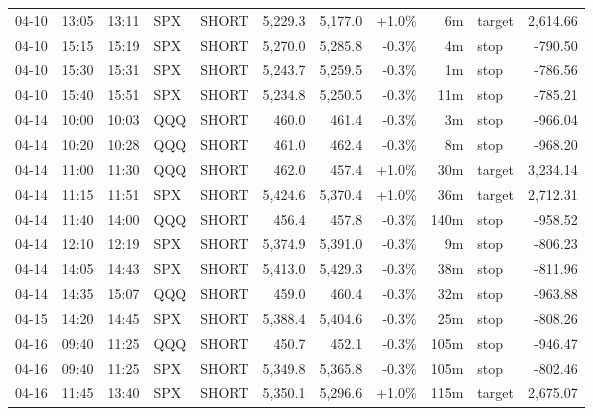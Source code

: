\documentclass[11pt,a4paper,twoside]{article}
\begin{document}
\begin{center}
\begin{longtable}{>{\color{txtmain}}l l l l l r r r r >{\color{txtmain}}l r}
04-10 & 13:05 & 13:11 & SPX & SHORT & 5,229.3 & 5,177.0 & \textcolor{wingreen}{+1.0\%} & 6m & target & \textcolor{wingreen}{2,614.66} \\
04-10 & 15:15 & 15:19 & SPX & SHORT & 5,270.0 & 5,285.8 & \textcolor{lossred}{-0.3\%} & 4m & stop & \textcolor{lossred}{-790.50} \\
04-10 & 15:30 & 15:31 & SPX & SHORT & 5,243.7 & 5,259.5 & \textcolor{lossred}{-0.3\%} & 1m & stop & \textcolor{lossred}{-786.56} \\
04-10 & 15:40 & 15:51 & SPX & SHORT & 5,234.8 & 5,250.5 & \textcolor{lossred}{-0.3\%} & 11m & stop & \textcolor{lossred}{-785.21} \\
04-14 & 10:00 & 10:03 & QQQ & SHORT & 460.0 & 461.4 & \textcolor{lossred}{-0.3\%} & 3m & stop & \textcolor{lossred}{-966.04} \\
04-14 & 10:20 & 10:28 & QQQ & SHORT & 461.0 & 462.4 & \textcolor{lossred}{-0.3\%} & 8m & stop & \textcolor{lossred}{-968.20} \\
04-14 & 11:00 & 11:30 & QQQ & SHORT & 462.0 & 457.4 & \textcolor{wingreen}{+1.0\%} & 30m & target & \textcolor{wingreen}{3,234.14} \\
04-14 & 11:15 & 11:51 & SPX & SHORT & 5,424.6 & 5,370.4 & \textcolor{wingreen}{+1.0\%} & 36m & target & \textcolor{wingreen}{2,712.31} \\
04-14 & 11:40 & 14:00 & QQQ & SHORT & 456.4 & 457.8 & \textcolor{lossred}{-0.3\%} & 140m & stop & \textcolor{lossred}{-958.52} \\
04-14 & 12:10 & 12:19 & SPX & SHORT & 5,374.9 & 5,391.0 & \textcolor{lossred}{-0.3\%} & 9m & stop & \textcolor{lossred}{-806.23} \\
04-14 & 14:05 & 14:43 & SPX & SHORT & 5,413.0 & 5,429.3 & \textcolor{lossred}{-0.3\%} & 38m & stop & \textcolor{lossred}{-811.96} \\
04-14 & 14:35 & 15:07 & QQQ & SHORT & 459.0 & 460.4 & \textcolor{lossred}{-0.3\%} & 32m & stop & \textcolor{lossred}{-963.88} \\
04-15 & 14:20 & 14:45 & SPX & SHORT & 5,388.4 & 5,404.6 & \textcolor{lossred}{-0.3\%} & 25m & stop & \textcolor{lossred}{-808.26} \\
04-16 & 09:40 & 11:25 & QQQ & SHORT & 450.7 & 452.1 & \textcolor{lossred}{-0.3\%} & 105m & stop & \textcolor{lossred}{-946.47} \\
04-16 & 09:40 & 11:25 & SPX & SHORT & 5,349.8 & 5,365.8 & \textcolor{lossred}{-0.3\%} & 105m & stop & \textcolor{lossred}{-802.46} \\
04-16 & 11:45 & 13:40 & SPX & SHORT & 5,350.1 & 5,296.6 & \textcolor{wingreen}{+1.0\%} & 115m & target & \textcolor{wingreen}{2,675.07} \\

\end{longtable}
\end{center}
\end{document}
